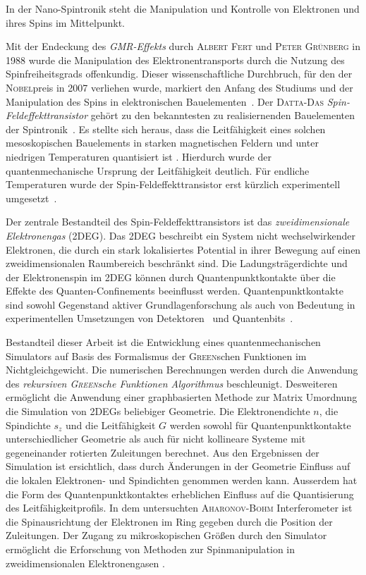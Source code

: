 In der Nano-Spintronik steht die Manipulation und Kontrolle von Elektronen und ihres Spins im Mittelpunkt.\par
Mit der Endeckung des \emph{GMR-Effekts} durch \textsc{Albert Fert} und \textsc{Peter Gr\"unberg} in 1988 wurde die Manipulation des Elektronentransports durch die Nutzung des Spinfreiheitsgrads offenkundig. Dieser wissenschaftliche Durchbruch, f\"ur den der \textsc{Nobel}preis in 2007 verliehen wurde, markiert den Anfang des Studiums und der Manipulation des Spins in elektronischen Bauelementen~\cite{evegeny2010spin}. Der \textsc{Datta-Das} \emph{Spin-Feldeffekttransistor} geh\"ort zu den bekanntesten zu realisiernenden Bauelementen der Spintronik~\cite{datta:665}. Es stellte sich heraus, dass die Leitf\"ahigkeit eines solchen mesoskopischen Bauelements in starken magnetischen Feldern und unter niedrigen Temperaturen quantisiert ist \cite{PhysRevLett.45.494}. Hierdurch wurde der quantenmechanische Ursprung der Leitf\"ahigkeit deutlich. F\"ur endliche Temperaturen wurde der Spin-Feldeffekttransistor erst k\"urzlich experimentell umgesetzt~\cite{Wunderlich24122010}.\par
Der zentrale Bestandteil des Spin-Feldeffekttransistors ist das \emph{zweidimensionale Elektronengas} (2DEG). Das 2DEG beschreibt ein System nicht wechselwirkender Elektronen, die durch ein stark lokalisiertes Potential in ihrer Bewegung auf einen zweidimensionalen Raumbereich beschr\"ankt sind. Die Ladungstr\"agerdichte und der Elektronenspin im 2DEG k\"onnen durch Quantenpunktkontakte \"uber die Effekte des Quanten-Confinements beeinflusst werden. Quantenpunktkontakte sind sowohl Gegenstand aktiver Grundlagenforschung als auch von Bedeutung in experimentellen Umsetzungen von Detektoren~\cite{PhysRevB.67.161308} und Quantenbits~\cite{PhysRevA.57.120}.\par
Bestandteil dieser Arbeit ist die Entwicklung eines quantenmechanischen Simulators auf Basis des Formalismus der \textsc{Green}schen Funktionen im Nichtgleichgewicht. Die numerischen Berechnungen werden durch die Anwendung des \emph{rekursiven \textsc{Green}sche Funktionen Algorithmus} beschleunigt. Desweiteren erm\"oglicht die Anwendung einer graphbasierten Methode zur Matrix Umordnung die Simulation von 2DEGs beliebiger Geometrie. Die Elektronendichte $n$, die Spindichte $s_z$ und die Leitf\"ahigkeit $G$ werden sowohl f\"ur Quantenpunktkontakte unterschiedlicher Geometrie als auch f\"ur nicht kollineare Systeme mit gegeneinander rotierten Zuleitungen berechnet. Aus den Ergebnissen der Simulation ist ersichtlich, dass durch \"Anderungen in der Geometrie Einfluss auf die lokalen Elektronen- und Spindichten genommen werden kann. Ausserdem hat die Form des Quantenpunktkontaktes erheblichen Einfluss auf die Quantisierung des Leitf\"ahigkeitprofils. In dem untersuchten \textsc{Aharonov-Bohm} Interferometer ist die Spinausrichtung der Elektronen im Ring gegeben durch die Position der Zuleitungen. Der Zugang zu mikroskopischen Gr\"o\ss en durch den Simulator erm\"oglicht die Erforschung von Methoden zur Spinmanipulation in zweidimensionalen Elektronengasen .
